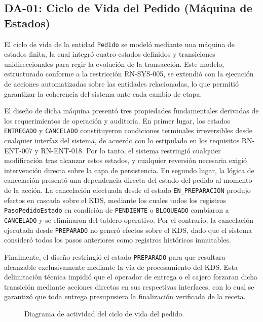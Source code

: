 \subsection{DA-01: Ciclo de Vida del Pedido (Máquina de Estados)}

El ciclo de vida de la entidad \texttt{Pedido} se modeló mediante una máquina de estados finita, la cual integró cuatro estados definidos y transiciones unidireccionales para regir la evolución de la transacción. Este modelo, estructurado conforme a la restricción RN-SYS-005, se extendió con la ejecución de acciones automatizadas sobre las entidades relacionadas, lo que permitió garantizar la coherencia del sistema ante cada cambio de etapa.

El diseño de dicha máquina presentó tres propiedades fundamentales derivadas de los requerimientos de operación y auditoría. En primer lugar, los estados \texttt{ENTREGADO} y \texttt{CANCELADO} constituyeron condiciones terminales irreversibles desde cualquier interfaz del sistema, de acuerdo con lo estipulado en los requisitos RN-ENT-007 y RN-ENT-018. Por lo tanto, el sistema restringió cualquier modificación tras alcanzar estos estados, y cualquier reversión necesaria exigió intervención directa sobre la capa de persistencia. En segundo lugar, la lógica de cancelación presentó una dependencia directa del estado del pedido al momento de la acción. La cancelación efectuada desde el estado \texttt{EN\_PREPARACION} produjo efectos en cascada sobre el KDS, mediante los cuales todos los registros \texttt{PasoPedidoEstado} en condición de \texttt{PENDIENTE} o \texttt{BLOQUEADO} cambiaron a \texttt{CANCELADO} y se eliminaron del tablero operativo. Por el contrario, la cancelación ejecutada desde \texttt{PREPARADO} no generó efectos sobre el KDS, dado que el sistema consideró todos los pasos anteriores como registros históricos inmutables.

Finalmente, el diseño restringió el estado \texttt{PREPARADO} para que resultara alcanzable exclusivamente mediante la vía de procesamiento del KDS. Esta delimitación técnica impidió que el operador de entrega o el cajero forzaran dicha transición mediante acciones directas en sus respectivas interfaces, con lo cual se garantizó que toda entrega presupusiera la finalización verificada de la receta.

\begin{landscape}
\begin{figure}[H]
    \centering
    
    \caption{Diagrama de actividad del ciclo de vida del pedido.}
    \label{fig:diagrama-actividad-ciclo-vida-pedido}
\end{figure}
\end{landscape}

